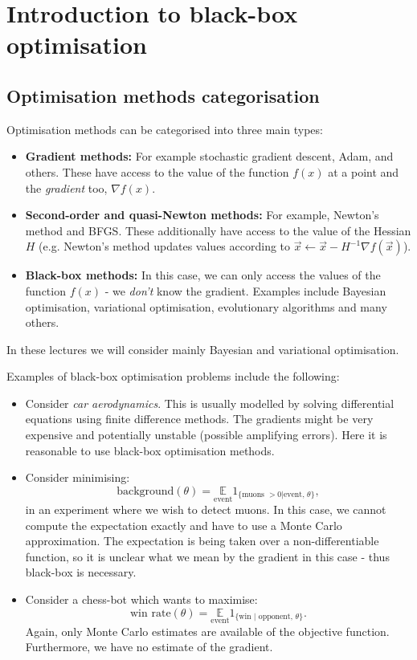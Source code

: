 \newpage
\section{Introduction to black-box optimisation}

\subsection{Optimisation methods categorisation}
Optimisation methods can be categorised into three main types:
\begin{itemize}
\item \textbf{Gradient methods:} For example stochastic gradient descent, Adam, and others. These have access to the value of the function $f(x)$ at a point and the \textit{gradient} too, $\nabla f(x)$.
\item \textbf{Second-order and quasi-Newton methods:} For example, Newton's method and BFGS. These additionally have access to the value of the Hessian $H$ (e.g. Newton's method updates values according to $\vec{x} \leftarrow \vec{x} - H^{-1} \nabla f(\vec{x})$).
\item \textbf{Black-box methods:} In this case, we can only access the values of the function $f(x)$ - we \textit{don't} know the gradient. Examples include Bayesian optimisation, variational optimisation, evolutionary algorithms and many others.
\end{itemize}

In these lectures we will consider mainly Bayesian and variational optimisation. 

\begin{frameex}
Examples of black-box optimisation problems include the following:
\begin{itemize}
\item Consider \textit{car aerodynamics}. This is usually modelled by solving differential equations using finite difference methods. The gradients might be very expensive and potentially unstable (possible amplifying errors). Here it is reasonable to use black-box optimisation methods.
\item Consider minimising:
\begin{equation*}
\textrm{background}(\theta) = \underset{\textrm{event}}{\mathbb{E}} 1_{\{\text{muons }>0 | \text{event, }\theta\}},
\end{equation*}
in an experiment where we wish to detect muons. In this case, we cannot compute the expectation exactly and have to use a Monte Carlo approximation. The expectation is being taken over a non-differentiable function, so it is unclear what we mean by the gradient in this case - thus black-box is necessary.
\item Consider a chess-bot which wants to maximise:
\begin{equation*}
\textrm{win rate}(\theta) = \underset{\textrm{event}}{\mathbb{E}} 1_{\{\text{win }|\text{ opponent, }\theta\}}.
\end{equation*}
Again, only Monte Carlo estimates are available of the objective function. Furthermore, we have no estimate of the gradient. 
\end{itemize}
\end{frameex}

